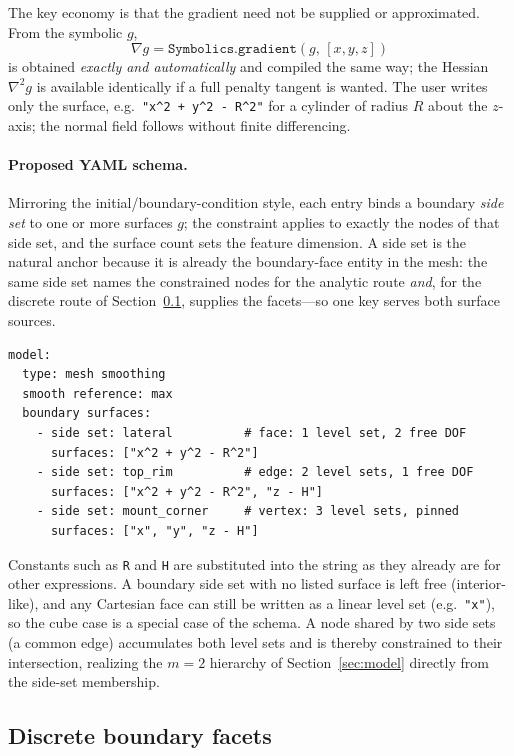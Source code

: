 \documentclass[11pt]{article}
\newcommand{\grad}{\nabla}
\newcommand{\code}[1]{\texttt{#1}}
\begin{document}
The key economy is that the gradient need not be supplied or approximated. From
the symbolic $g$,
\begin{equation}
  \grad g = \code{Symbolics.gradient}(g,\,[x,y,z])
\end{equation}
is obtained \emph{exactly and automatically} and compiled the same way; the
Hessian $\grad^2 g$ is available identically if a full penalty tangent is
wanted. The user writes only the surface, e.g.\ \code{"x\^{}2 + y\^{}2 - R\^{}2"}
for a cylinder of radius $R$ about the $z$-axis; the normal field follows
without finite differencing.

\paragraph{Proposed YAML schema.} Mirroring the initial/boundary-condition
style, each entry binds a boundary \emph{side set} to one or more surfaces $g$;
the constraint applies to exactly the nodes of that side set, and the surface
count sets the feature dimension. A side set is the natural anchor because it is
already the boundary-face entity in the mesh: the same side set names the
constrained nodes for the analytic route \emph{and}, for the discrete route of
Section~\ref{sec:discrete}, supplies the facets---so one key serves both surface
sources.
\begin{verbatim}
model:
  type: mesh smoothing
  smooth reference: max
  boundary surfaces:
    - side set: lateral          # face: 1 level set, 2 free DOF
      surfaces: ["x^2 + y^2 - R^2"]
    - side set: top_rim          # edge: 2 level sets, 1 free DOF
      surfaces: ["x^2 + y^2 - R^2", "z - H"]
    - side set: mount_corner     # vertex: 3 level sets, pinned
      surfaces: ["x", "y", "z - H"]
\end{verbatim}
Constants such as \code{R} and \code{H} are substituted into the string as they
already are for other expressions. A boundary side set with no listed surface is
left free (interior-like), and any Cartesian face can still be written as a
linear level set (e.g.\ \code{"x"}), so the cube case is a special case of the
schema. A node shared by two side sets (a common edge) accumulates both level
sets and is thereby constrained to their intersection, realizing the
$m=2$ hierarchy of Section~\ref{sec:model} directly from the side-set
membership.

\subsection{Discrete boundary facets}
\label{sec:discrete}
\end{document}
